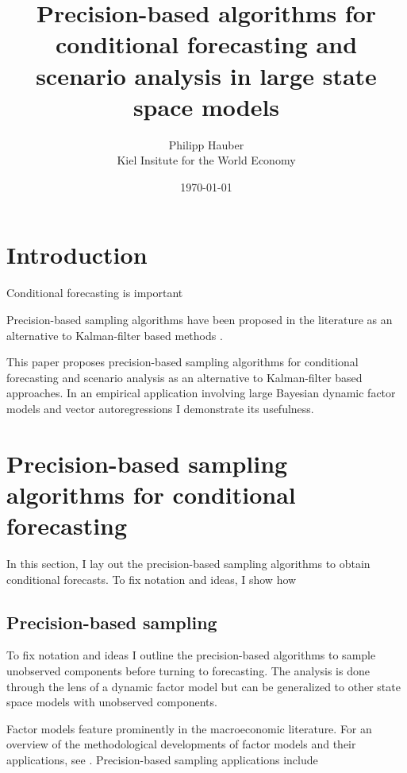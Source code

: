 \documentclass[notitlepage,a4paper,12pt]{article}
\begin{document}
\title{Precision-based algorithms for conditional forecasting and scenario analysis in large state space models}

\author{
  Philipp Hauber\\
  Kiel Insitute for the World Economy
}
\date{\today}

\maketitle

\section{Introduction}

Conditional forecasting is important \citep{bgl_2015ijf}

Precision-based sampling algorithms have been proposed in the literature as an alternative to Kalman-filter based methods \citep{chanjeliazkov_2009}.

This paper proposes precision-based sampling algorithms for conditional forecasting and scenario analysis as an alternative to Kalman-filter based approaches. In an empirical application involving large Bayesian dynamic factor models and vector autoregressions I demonstrate its usefulness. 

\section{Precision-based sampling algorithms for conditional forecasting}\label{sec:precsampler}

In this section, I lay out the precision-based sampling algorithms to obtain conditional forecasts. To fix notation and ideas, I show how 
\subsection{Precision-based sampling}\label{subsec:precsampler}

To fix notation and ideas I outline the precision-based algorithms to sample unobserved components before turning to forecasting. The analysis is done through the lens of a dynamic factor model but can be generalized to other state space models with unobserved components.

Factor models feature prominently in the macroeconomic literature. For an overview of the methodological developments of factor models and their applications, see \citet{stockwatson2016_hbmacro}. Precision-based sampling applications include \citet{chanjeliazkov_2009,mccausland_factor2015,kaufmannschumacher_jae2017,kaufmannschumacher_jectrcs2019}\\
\end{document}
